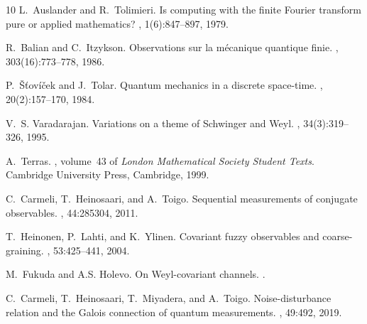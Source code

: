 \documentclass[12pt,reqno]{amsart}
\theoremstyle{definition}
\begin{document}
\begin{thebibliography}{10}
L.~Auslander and R.~Tolimieri.
\newblock Is computing with the finite {F}ourier transform pure or applied
  mathematics?
, 1(6):847--897, 1979.

R.~Balian and C.~Itzykson.
\newblock Observations sur la m\'ecanique quantique finie.
, 303(16):773--778, 1986.

P.~\v{S}\v{t}ov\'i\v{c}ek and J.~Tolar.
\newblock Quantum mechanics in a discrete space-time.
, 20(2):157--170, 1984.

V.~S. Varadarajan.
\newblock Variations on a theme of {S}chwinger and {W}eyl.
, 34(3):319--326, 1995.

A.~Terras.
, volume~43
  of {\em London Mathematical Society Student Texts}.
\newblock Cambridge University Press, Cambridge, 1999.

C.~Carmeli, T.~Heinosaari, and A.~Toigo.
\newblock Sequential measurements of conjugate observables.
, 44:285304, 2011.

T.~Heinonen, P.~Lahti, and K.~Ylinen.
\newblock Covariant fuzzy observables and coarse-graining.
, 53:425--441, 2004.

M.~Fukuda and A.S. Holevo.
\newblock On {W}eyl-covariant channels.
.

C.~Carmeli, T.~Heinosaari, T.~Miyadera, and A.~Toigo.
\newblock Noise-disturbance relation and the {G}alois connection of quantum
  measurements.
, 49:492, 2019.

\end{thebibliography}

\end{document}
